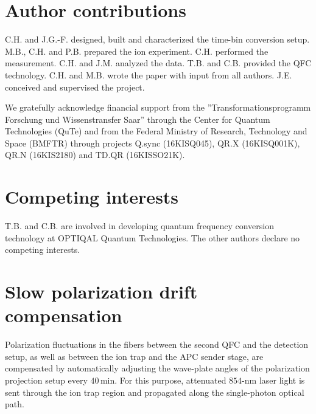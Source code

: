 \documentclass[reprint, superscriptaddress, longbibliography, floatfix, twocolumn, nofootinbib, amsmath, amssymb, aps, showkeys]{revtex4-2}
\begin{document}


\section*{Author contributions}

C.H. and J.G.-F. designed, built and characterized the time-bin conversion setup. 
M.B., C.H. and P.B. prepared the ion experiment.
C.H. performed the measurement. C.H. and J.M. analyzed the data.
T.B. and C.B. provided the QFC technology. 
C.H. and M.B. wrote the paper with input from all authors.
J.E. conceived and supervised the project.

\begin{acknowledgments}
We gratefully acknowledge financial support from the ''Transformationsprogramm Forschung und Wissenstransfer Saar'' through the Center for Quantum Technologies (QuTe) and from the Federal Ministry of Research, Technology and Space (BMFTR) through projects Q.sync (16KISQ045), QR.X (16KISQ001K), QR.N (16KIS2180) and TD.QR (16KISSO21K).
\end{acknowledgments}

\section*{Competing interests}
T.B. and C.B. are involved in developing quantum frequency conversion technology at OPTIQAL Quantum Technologies. The other authors declare no competing interests.


\appendix

\section{Slow polarization drift compensation}\label{app:slow_pol_comp}
Polarization fluctuations in the fibers between the second QFC and the detection setup, as well as between the ion trap and the APC sender stage, are compensated by automatically adjusting the wave-plate angles of the polarization projection setup every $40\,$min. For this purpose, attenuated $854$-nm laser light is sent through the ion trap region and propagated along the single-photon optical path.
\end{document}
